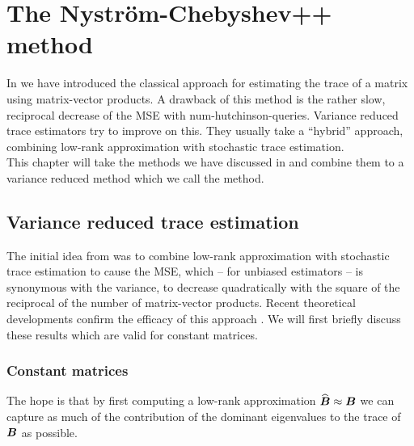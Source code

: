 \chapter{The Nystr\"om-Chebyshev++ method}
\label{chp:4-nystromchebyshev}

In  we have introduced the
classical approach for estimating the trace of a matrix using matrix-vector
products. A drawback of this method is the rather slow, reciprocal decrease of
the \gls{MSE} with \gls{num-hutchinson-queries}. Variance reduced trace estimators
try to improve on this. They usually take a \enquote{hybrid} approach, combining
low-rank approximation with stochastic trace estimation.\\

This chapter will take the methods we have discussed in 
and  combine them to a variance reduced method which
we call the  method.


\section{Variance reduced trace estimation}
\label{sec:4-nystromchebyshev-hybrid}

The initial idea from \cite{lin2017randomized} was to combine low-rank approximation
with stochastic trace estimation to cause the \gls{MSE}, which -- for unbiased estimators
-- is synonymous with the variance, to decrease quadratically with the square
of the reciprocal of the number of matrix-vector products.
Recent theoretical developments confirm the
efficacy of this approach \cite{meyer2021hutch,persson2022hutch}.
We will first briefly discuss these results which are valid 
for constant matrices.\\

\subsection{Constant matrices}
\label{subsec:4-nystromchebyshev-reduction-constant-matrices}

The hope is that by first computing a low-rank approximation $\widehat{\boldsymbol{B}} \approx \boldsymbol{B}$
we can capture as much of the contribution of the dominant eigenvalues to the
trace of $\boldsymbol{B}$ as possible.


